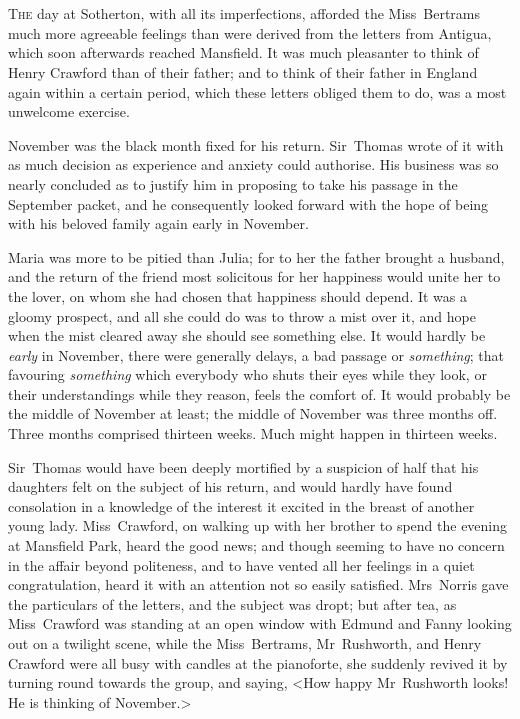 \chapter[Chapter \thechapter]{} 
	
 \lettrine[lraise=0.3]{T}{he} day at Sotherton, with all its imperfections, afforded the Miss~Bertrams much more agreeable feelings than were derived from the letters from Antigua, which soon afterwards reached Mansfield. It was much pleasanter to think of Henry Crawford than of their father; and to think of their father in England again within a certain period, which these letters obliged them to do, was a most unwelcome exercise.

November was the black month fixed for his return. Sir~Thomas wrote of it with as much decision as experience and anxiety could authorise. His business was so nearly concluded as to justify him in proposing to take his passage in the September packet, and he consequently looked forward with the hope of being with his beloved family again early in November.

Maria was more to be pitied than Julia; for to her the father brought a husband, and the return of the friend most solicitous for her happiness would unite her to the lover, on whom she had chosen that happiness should depend. It was a gloomy prospect, and all she could do was to throw a mist over it, and hope when the mist cleared away she should see something else. It would hardly be \textit{early}  in November, there were generally delays, a bad passage or \textit{something}; that favouring \textit{something}  which everybody who shuts their eyes while they look, or their understandings while they reason, feels the comfort of. It would probably be the middle of November at least; the middle of November was three months off. Three months comprised thirteen weeks. Much might happen in thirteen weeks.

Sir~Thomas would have been deeply mortified by a suspicion of half that his daughters felt on the subject of his return, and would hardly have found consolation in a knowledge of the interest it excited in the breast of another young lady. Miss~Crawford, on walking up with her brother to spend the evening at Mansfield Park, heard the good news; and though seeming to have no concern in the affair beyond politeness, and to have vented all her feelings in a quiet congratulation, heard it with an attention not so easily satisfied. Mrs~Norris gave the particulars of the letters, and the subject was dropt; but after tea, as Miss~Crawford was standing at an open window with Edmund and Fanny looking out on a twilight scene, while the Miss~Bertrams, Mr~Rushworth, and Henry Crawford were all busy with candles at the pianoforte, she suddenly revived it by turning round towards the group, and saying, <How happy Mr~Rushworth looks! He is thinking of November.>

